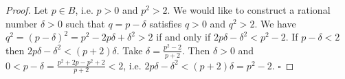 \documentclass[10pt,varwidth=6in,margin=0.2in,preview]{standalone}
\begin{document}
\begin{flushleft}
\begin{proof}
Let $p \in B$, i.e. $p > 0$ and $p^2 > 2$.
We would like to construct a rational number $\delta > 0$ such that $q = p - \delta$ satisfies $q > 0$ and $q^2 > 2$.
We have $q^2 = (p - \delta)^2 = p^2 - 2 p \delta + \delta^2 > 2$ if and only if $2 p \delta - \delta^2 < p^2 - 2$. 
If $p - \delta < 2$ then $2 p \delta - \delta^2 < (p + 2) \delta$.
Take $\delta = \frac{p^2 - 2}{p + 2}$.
Then $\delta > 0$ and $0 < p - \delta = \frac{p^2 + 2p - p^2 + 2}{p + 2} < 2$,
i.e. $2 p \delta - \delta^2 < (p + 2) \delta = p^2 - 2$. $\square$
\end{proof}


\end{flushleft}
\end{document}
